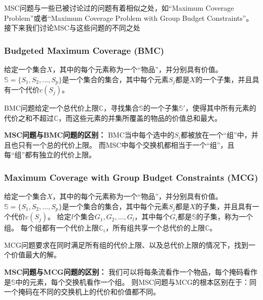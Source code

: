 MSC问题与一些已被讨论过的问题有着相似之处，如“Maximum Coverage Problem”\cite{khuller1999budgeted}或者“Maximum Coverage Problem with Group Budget Constraints”\cite{chekuri2004maximum}。
接下来我们讨论MSC与这些问题的不同之处

\subsubsection{Budgeted Maximum Coverage (BMC)\cite{khuller1999budgeted}}
给定一个集合$X$，其中的每个元素称为一个“物品”，并分别具有价值。
$\mathds{S}=\{S_1,S_2,...,S_p\}$是一个集合的集合，其中每个元素$S_j$都是$X$的一个子集，并且具有一个代价$c(S_j)$。

BMC问题给定一个总代价上限$\mathds{C} $，寻找集合$\mathds{S}$的一个子集$\mathds{S}'$，使得其中所有元素的代价之和不超过$\mathds{C} $，而这些元素的并集所覆盖的物品的价值总和最大。

\textbf{MSC问题与BMC问题的区别：} 
BMC当中每个选中的$S_i$都被放在一个“组”中，并且也只有一个总的代价上限。
而MSC中每个交换机都相当于一个“组”，且每“组”都有独立的代价上限。


\subsubsection{Maximum Coverage with Group Budget Constraints (MCG)\cite{chekuri2004maximum}}\label{def:mcg}
给定一个集合$X$，其中的每个元素称为一个“物品”，并分别具有价值。
$\mathds{S}=\{S_1,S_2,...,S_p\}$是一个集合的集合，其中每个元素$S_j$都是$X$的子集，并且具有一个代价$c(S_j)$。
给定$l$个集合$G_1,G_2,...,G_l$，其中每个$G_i$都是$\mathds{S}$的子集，称为一个组。
每个组都有一个代价上限$\mathds{C}_i$，所有组共享一个总代价的上限$\mathds{C} $。

MCG问题要求在同时满足所有组的代价上限、以及总代价上限的情况下，找到一个价值最大的解。

\textbf{MSC问题与MCG问题的区别：} 
我们可以将每条流看作一个物品，每个掩码看作是$\mathds{S}$中的元素，每个交换机看作一个组。
则MSC问题与MCG的根本区别在于：同一个掩码在不同的交换机上的代价和价值都不同。
